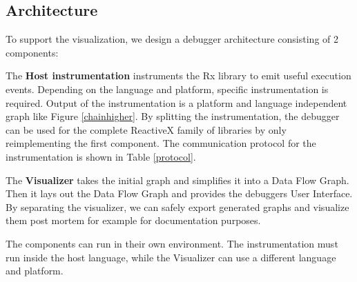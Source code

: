 \subsection{Architecture}
To support the visualization, we design a debugger architecture consisting of 2 components:

The \textbf{Host instrumentation} instruments the Rx library to emit useful execution events. Depending on the language and platform, specific instrumentation is required. Output of the instrumentation is a platform and language independent graph like Figure \ref{chainhigher}. By splitting the instrumentation, the debugger can be used for the complete ReactiveX family of libraries by only reimplementing the first component. The communication protocol for the instrumentation is shown in Table \ref{protocol}. 

The \textbf{Visualizer} takes the initial graph and simplifies it into a Data Flow Graph. Then it lays out the Data Flow Graph and provides the debuggers User Interface. By separating the visualizer, we can safely export generated graphs and visualize them post mortem for example for documentation purposes.

The components can run in their own environment. The instrumentation must run inside the host language, while the Visualizer can use a different language and platform.

\begin{figure*}
\texttt{[image: \{images/screenshot.mergeAll.crop]}.png}
\caption{Screenshot of \href{http://rxfiddle.net/\#type=editor&code=Y29uc3Qgc291cmNlMSA9IFJ4Lk9ic2VydmFibGUKICAub2YoMSwgMiwgMywgNCkKCmNvbnN0IHNvdXJjZTIgPSBSeC5PYnNlcnZhYmxlCiAgLm9mKCJhIiwgImIiLCAiYyIsICJkIikKClJ4Lk9ic2VydmFibGUKICAub2Yoc291cmNlMSwgc291cmNlMikKICAubWVyZ2VBbGwoKQogIC5za2lwKDIpCiAgLnN1YnNjcmliZSgp}{RxFiddle.net}}
\label{screenshot-mergeAll}
\end{figure*}

